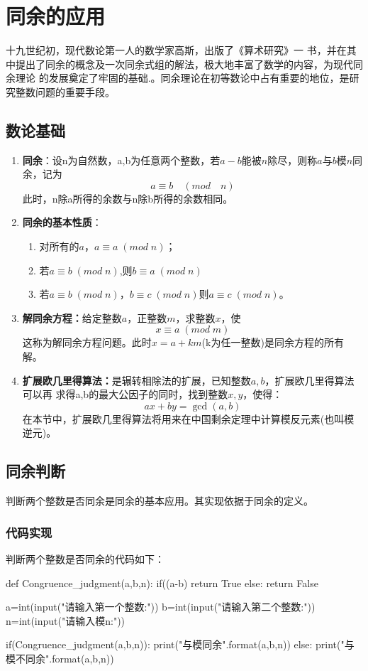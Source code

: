 \documentclass[UTF8]{ctexart}
\begin{document}
\section{同余的应用}
\par 十九世纪初，现代数论第一人的数学家高斯，出版了《算术研究》一
书，并在其中提出了同余的概念及一次同余式组的解法，极大地丰富了数学的内容，为现代同余理论
的发展奠定了牢固的基础.。同余理论在初等数论中占有重要的地位，是研究整数问题的重要手段\cite{ref5}。
\subsection{数论基础}
\begin{enumerate}[(1)]
\item \textbf{同余}：设n为自然数，a,b为任意两个整数，若$a-b$能被$n$除尽，则称$a$与$b$模$n$同余，记为
\[a\equiv  b\quad (mod \quad n)\]
此时，n除a所得的余数与n除b所得的余数相同。
\item \textbf{同余的基本性质}：
  \begin{enumerate}[1)]
  \item 对所有的$a$，$a\equiv a\; (mod\; n)$；
  \item 若$a\equiv b\; (mod\; n)$,则$b\equiv a\; (mod\; n)$
  \item 若$a\equiv b\; (mod\; n)$，$b\equiv c\; (mod\; n)$则$a\equiv c\; (mod\; n)$。
  \end{enumerate}
\item \textbf{解同余方程：}给定整数$a$，正整数$m$，求整数$x$，使\[x\equiv a\; (mod\; m)\]
这称为解同余方程问题。此时$x=a+km$(k为任一整数)是同余方程的所有解。
\item \textbf{扩展欧几里得算法：}是辗转相除法的扩展，已知整数$a,b$，扩展欧几里得算法可以再
求得a,b的最大公因子的同时，找到整数$x,y$，使得：\[ax+by=\operatorname{gcd}(a,b)\]
在本节中，扩展欧几里得算法将用来在中国剩余定理中计算模反元素(也叫模逆元)。
\end{enumerate}
\subsection{同余判断}
\par 判断两个整数是否同余是同余的基本应用。其实现依据于同余的定义。
\subsubsection{代码实现}
\par 判断两个整数是否同余的代码如下：
\begin{python}
def Congruence_judgment(a,b,n):
  if((a-b)%
      return True
  else:
      return False

a=int(input("请输入第一个整数:"))
b=int(input("请输入第二个整数:"))
n=int(input("请输入模n:"))

if(Congruence_judgment(a,b,n)):
  print("{}与{}模{}同余".format(a,b,n))
else:
  print("{}与{}模{}不同余".format(a,b,n))
\end{python}
\end{document}
